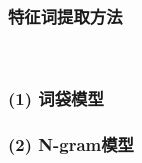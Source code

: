 \documentclass[cs4size,a4paper]{ctexart}
\numberwithin{equation}{section}
\numberwithin{table}{section}
\numberwithin{figure}{section}
\begin{document}


\subsubsection{特征词提取方法}~\label{subsec:feature}

\subsubsection*{(1) 词袋模型}



\subsubsection*{(2) N-gram模型}


\end{document}
